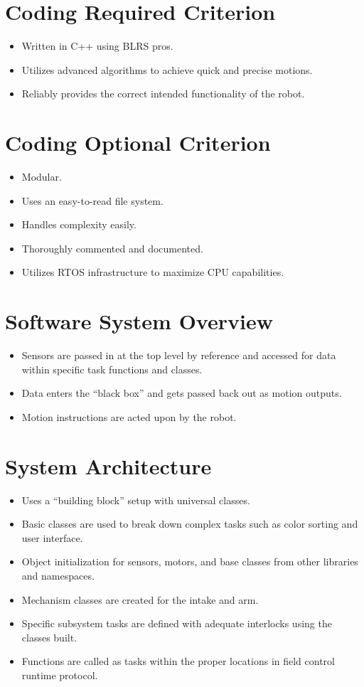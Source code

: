 \section*{Coding Required Criterion}
\begin{itemize}
    \item Written in C++ using BLRS pros.
    \item Utilizes advanced algorithms to achieve quick and precise motions.
    \item Reliably provides the correct intended functionality of the robot.
\end{itemize}

\section*{Coding Optional Criterion}
\begin{itemize}
    \item Modular.
    \item Uses an easy-to-read file system.
    \item Handles complexity easily.
    \item Thoroughly commented and documented.
    \item Utilizes RTOS infrastructure to maximize CPU capabilities.
\end{itemize}

\section*{Software System Overview}
\begin{itemize}
    \item Sensors are passed in at the top level by reference and accessed for data within specific task functions and classes.
    \item Data enters the “black box” and gets passed back out as motion outputs.
    \item Motion instructions are acted upon by the robot.
\end{itemize}

\section*{System Architecture}
\begin{itemize}
    \item Uses a “building block” setup with universal classes.
    \item Basic classes are used to break down complex tasks such as color sorting and user interface.
    \item Object initialization for sensors, motors, and base classes from other libraries and namespaces.
    \item Mechanism classes are created for the intake and arm.
    \item Specific subsystem tasks are defined with adequate interlocks using the classes built.
    \item Functions are called as tasks within the proper locations in field control runtime protocol.
\end{itemize}

